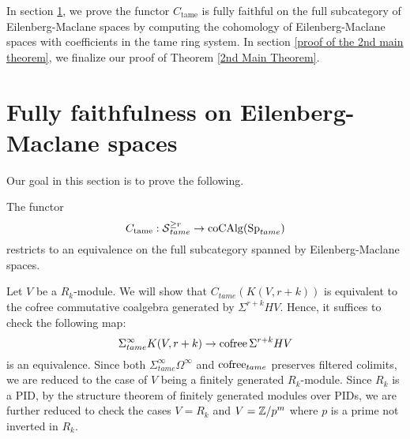 In section \ref{Section: Fully faithfulness on Eilenberg-Maclane spaces}, we prove the functor $C_{\operatorname{tame}}$ is fully faithful on the full subcategory of Eilenberg-Maclane spaces by computing the cohomology of Eilenberg-Maclane spaces with coefficients in the tame ring system.
In section \ref{proof of the 2nd main theorem}, we finalize our proof of Theorem \ref{2nd Main Theorem}.



\section{Fully faithfulness on Eilenberg-Maclane spaces}\label{Section: Fully faithfulness on Eilenberg-Maclane spaces}

Our goal in this section is to prove the following.
\begin{proposition}
\label{Fully faithfulness of C_tame on EM spaces}
	The functor
	$$
	C_{\operatorname{tame}}:\operatorname{\mathcal{S}}^{\geq r}_{tame}\to \operatorname{coCAlg}(\operatorname{Sp}_{tame})
	$$
restricts to an equivalence on the full subcategory spanned by Eilenberg-Maclane spaces.
\end{proposition}


Let $V$ be a $R_{k}$-module. We will show that $C_{tame}(K(V,r+k))$ is equivalent to the cofree commutative coalgebra generated by $\Sigma^{r+k}HV$.
Hence, it suffices to check the following map:
$$
\Sigma_{tame}^{\infty}K(V,r+k)\to \operatorname{cofree} \Sigma^{r+k}HV
$$
is an equivalence. Since both $\Sigma^{\infty}_{tame}\Omega^{\infty}$ and $\operatorname{cofree}_{tame}$ preserves filtered colimits, we are reduced to the case of $V$ being a finitely generated $R_k$-module. Since $R_k$ is a PID, by the structure theorem of finitely generated modules over PIDs, we are further reduced to check the cases $V=R_k$ and $V={\mathbb{Z}}/p^m$ where $p$ is a prime not inverted in $R_k$. 



